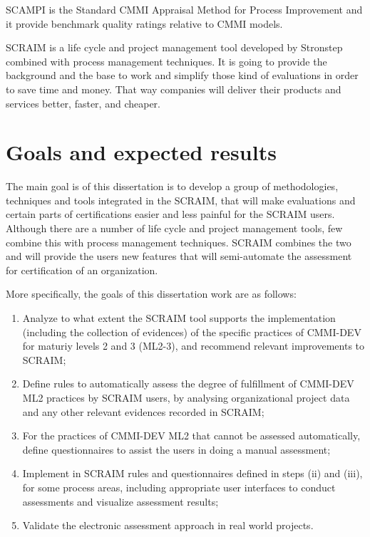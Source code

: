SCAMPI is the Standard CMMI Appraisal Method for Process Improvement and it provide benchmark quality ratings relative to CMMI models.

SCRAIM is a life cycle and project management tool developed by Stronstep combined with process management techniques. It is going to provide the background and the base to work and simplify those kind of evaluations in order to save time and money. That way companies will deliver their products and services better, faster, and cheaper.

\section{Goals and expected results} \label{sec:goals}

The main goal is of this dissertation is to develop a group of methodologies, techniques and tools integrated in the SCRAIM, that will make evaluations and certain parts of certifications easier and less painful for the SCRAIM users.
Although there are a number of life cycle and project management tools, few combine this with process management techniques. SCRAIM combines the two and will provide the users new features that will semi-automate the assessment for certification of an organization. 



More specifically, the goals of this dissertation work are as follows: 

\begin{enumerate}[i]%
	\item Analyze to what extent the SCRAIM tool supports the implementation (including the collection of evidences) of the specific practices of CMMI-DEV for maturiy levels 2 and 3 (ML2-3), and recommend relevant improvements to SCRAIM;
	\item Define rules to automatically assess the degree of fulfillment of CMMI-DEV ML2 practices by SCRAIM users, by analysing organizational project data and any other relevant evidences recorded in SCRAIM;
	\item For the practices  of CMMI-DEV ML2 that cannot be assessed automatically, define questionnaires to assist the users in doing a manual assessment;
	\item Implement in SCRAIM rules and questionnaires defined in steps (ii) and (iii), for some process areas, including appropriate user interfaces to conduct assessments and visualize assessment results;
	\item Validate the electronic assessment approach in real world projects.
\end{enumerate}

